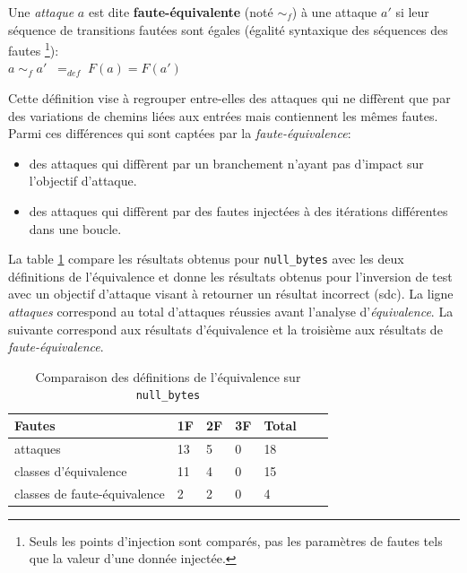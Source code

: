                 \begin{defi}
                    \label{def:feq}
                    Une \textit{attaque} $a$ est dite \textbf{faute-équivalente} (noté $\sim_f$) à une attaque $a'$ si leur séquence de transitions fautées sont égales (égalité syntaxique des séquences des fautes \footnote{Seuls les points d'injection sont comparés, pas les paramètres de fautes tels que la valeur d'une donnée injectée.}): \\
                    $a \; \sim_f \; a' \;\;=_{def} \; F(a) = F(a')$ 
                \end{defi}
            
                Cette définition vise à regrouper entre-elles des attaques qui ne diffèrent que par des variations de chemins liées aux entrées mais contiennent les mêmes fautes. Parmi ces différences qui sont captées par la \textit{faute-équivalence}:
                \begin{itemize}
                    \item des attaques qui diffèrent par un branchement n'ayant pas d'impact sur l'objectif d'attaque.
                    \item des attaques qui diffèrent par des fautes injectées à des itérations différentes dans une boucle.
                \end{itemize}
                
                La table \ref{tbl:aeq-results} compare les résultats obtenus pour \texttt{null\_bytes} avec les deux définitions de l'équivalence et donne les résultats obtenus pour l'inversion de test avec un objectif d'attaque visant à retourner un résultat incorrect (\gls{sdc}).
                La ligne \textit{attaques} correspond au total d'attaques réussies avant l'analyse d'\textit{équivalence}.
                La suivante correspond aux résultats d'équivalence et la troisième aux résultats de \textit{faute-équivalence}.

                \begin{table}[ht]
                    \caption{Comparaison des définitions de l'équivalence sur \texttt{null\_bytes}}
                    \label{tbl:aeq-results}
                    \small
                    \begin{center}
                        \begin{tabular}{l|llllll}
                        Fautes & 1F & 2F & 3F & Total \\
                        \hline
                        attaques & 13 & 5 & 0 & 18\\
                        classes d'équivalence & 11 & 4 & 0 &  15 \\
                        classes de faute-équivalence & 2 & 2 & 0 & 4\\
                        \end{tabular}
                    \end{center}
                \end{table} 
            
